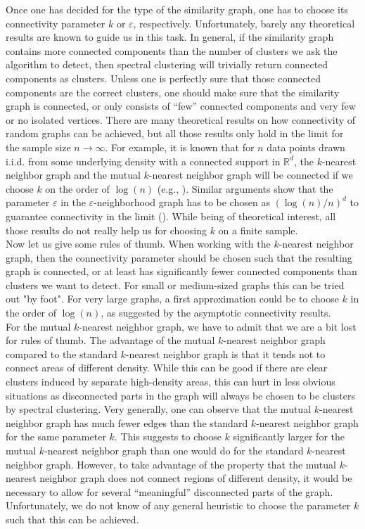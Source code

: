 \documentclass{article}
\newcommand{\RR}{\mathbb{R}}
\newcommand{\R}{\RR}
\newcommand{\eps}{\ensuremath{\varepsilon}}
\renewcommand{\epsilon}{\ensuremath{\varepsilon}}
\begin{document}
Once one has decided for the type of the similarity graph, one has to
choose its connectivity parameter $k$ or $\epsilon$, respectively.
Unfortunately, barely any theoretical results are known to guide us in
this task. 
%
In general, if the similarity graph contains more connected components
than the number of clusters we ask the algorithm to detect, then spectral
clustering will trivially return connected components as
clusters. Unless one is perfectly sure that those connected components
are the correct clusters, one should make sure that the
similarity graph is connected, or only consists of ``few'' connected
components and very few or no isolated vertices. There are many
theoretical results on how connectivity of random graphs can be
achieved, but all those results only hold in the limit for the sample
size $n \to \infty$. For example, it is known that for $n$ data points
drawn i.i.d. from some underlying density with a connected support
in $\R^d$, the $k$-nearest neighbor graph and the mutual
$k$-nearest neighbor graph will be connected if we choose $k$ on the
order of $\log(n)$ (e.g., ).  Similar arguments
show that the parameter $\eps$ in the $\eps$-neighborhood graph has to
be chosen as $(\log(n)/n )^d$ to guarantee connectivity in the limit
().  
While being of
theoretical interest, all those results do not really help us for
choosing $k$ on a finite sample.\\

Now let us give some rules of thumb. When working with the $k$-nearest
neighbor graph, then the connectivity parameter should be chosen such
that the resulting graph is connected, or at least has significantly
fewer connected components than clusters we want to detect. %
For small or medium-sized graphs this can
be tried out "by foot". For very large graphs, a first approximation
could be to choose $k$ in the order of $\log(n)$, as suggested by the
asymptotic connectivity results. \\

For the mutual $k$-nearest neighbor graph, we have to admit that we
are a bit lost for rules of thumb. The advantage of the mutual
$k$-nearest neighbor graph compared to the standard $k$-nearest
neighbor graph is that it tends not to connect areas of different
density. While this can be good if there are clear clusters induced by
separate high-density areas, this can hurt in less obvious situations
as disconnected parts in the graph will always be chosen to be
clusters by spectral clustering. Very generally, one can observe that
the mutual $k$-nearest neighbor graph has much fewer edges than the
standard $k$-nearest neighbor graph for the same parameter $k$. This
suggests to choose $k$ significantly larger for the mutual $k$-nearest
neighbor graph than one would do for the standard $k$-nearest neighbor
graph. %
However, to take advantage of the property that the
mutual $k$-nearest neighbor graph does not connect regions of
different density, it would be necessary to allow for several ``meaningful''
disconnected parts of the graph. Unfortunately, we do not know of any general
heuristic to choose the parameter $k$ such that this can be achieved. \\
\end{document}
